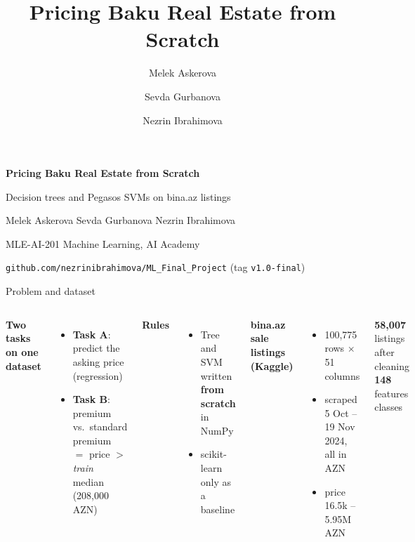 \documentclass[aspectratio=169,11pt]{beamer}
\title{Pricing Baku Real Estate from Scratch}
\author{Melek Askerova \and Sevda Gurbanova \and Nezrin Ibrahimova}
\date{}
\newcommand{\hl}[1]{{\Large\bfseries\color{accent}#1}}
\begin{document}
\begin{frame}[plain]
  \vfill
  {\huge\bfseries\color{accent}Pricing Baku Real Estate from Scratch\par}
  \vspace{0.4em}
  {\Large Decision trees and Pegasos SVMs on bina.az listings\par}
  \vspace{1.6em}
  Melek Askerova \quad Sevda Gurbanova \quad Nezrin Ibrahimova\par
  \vspace{0.3em}
  {\color{muted}MLE-AI-201 Machine Learning, AI Academy\par
  \texttt{github.com/nezrinibrahimova/ML\_Final\_Project} (tag \texttt{v1.0-final})\par}
  \vfill
\end{frame}

\begin{frame}{Problem and dataset}
  \begin{columns}[T]
    \textbf{Two tasks on one dataset}
    \begin{itemize}
      \item \textbf{Task A}: predict the asking price (regression)
      \item \textbf{Task B}: premium vs.\ standard\\
            premium $=$ price $>$ \emph{train} median (208,000 AZN)
    \end{itemize}
    \vspace{0.6em}
    \textbf{Rules}
    \begin{itemize}
      \item Tree and SVM written \textbf{from scratch} in NumPy
      \item scikit-learn only as a baseline
    \end{itemize}
    \textbf{bina.az sale listings (Kaggle)}
    \begin{itemize}
      \item 100,775 rows $\times$ 51 columns
      \item scraped 5 Oct -- 19 Nov 2024, all in AZN
      \item price 16.5k -- 5.95M AZN
    \end{itemize}
    \vspace{0.8em}
    \hl{58,007} listings after cleaning\\
    \hl{148} features \quad \hl{50/50} classes
  \end{columns}
\end{frame}
\end{document}
